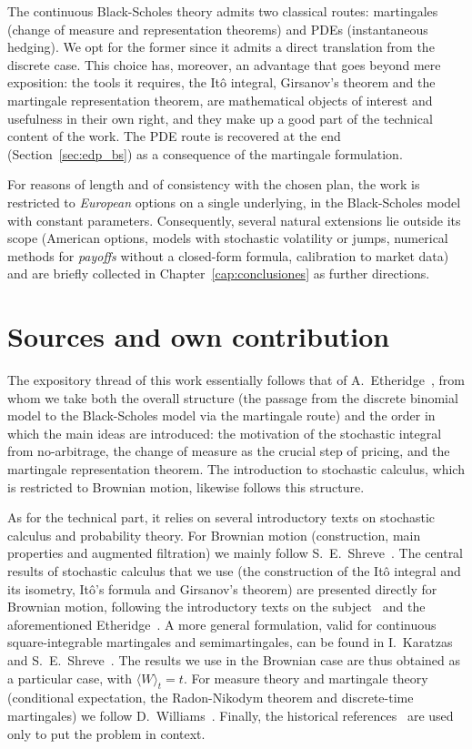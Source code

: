 \documentclass[11pt,a4paper,oneside]{report}
\theoremstyle{plain}
\theoremstyle{definition}
\theoremstyle{remark}
\newcommand{\1}{\mathbf{1}}
\begin{document}
The continuous Black-Scholes
theory admits two classical routes: martingales (change of measure
and representation theorems) and PDEs (instantaneous hedging). We opt
for the former since it admits a direct translation from the discrete
case. This choice has, moreover, an advantage that goes beyond mere
exposition: the tools it requires, the Itô integral, Girsanov's
theorem and the martingale representation theorem, are mathematical
objects of interest and usefulness in their own right, and they make
up a good part of the technical content of the work. The PDE route is
recovered at the end (Section~\ref{sec:edp_bs}) as a consequence of
the martingale formulation.

For reasons of
length and of consistency with the chosen plan, the work is
restricted to \emph{European} options on a single underlying, in the
Black-Scholes model with constant parameters. Consequently, several
natural extensions lie outside its scope (American options, models
with stochastic volatility or jumps, numerical methods for
\emph{payoffs} without a closed-form formula, calibration to market
data) and are briefly collected in Chapter~\ref{cap:conclusiones} as
further directions.

\section{Sources and own contribution}
\label{sec:aportacion}

The expository thread of this work essentially follows that of
A.~Etheridge~\cite{etheridge}, from whom we take both the overall
structure (the passage from the discrete binomial model to the
Black-Scholes model via the martingale route) and the order in which
the main ideas are introduced: the motivation of the stochastic
integral from no-arbitrage, the change of measure as the crucial step
of pricing, and the martingale representation theorem. The
introduction to stochastic calculus, which is restricted to Brownian
motion, likewise follows this structure.

As for the technical part, it relies on several introductory texts on
stochastic calculus and probability theory. For Brownian motion
(construction, main properties and augmented filtration) we mainly
follow S.~E.~Shreve~\cite{shreve}. The central results of stochastic
calculus that we use (the construction of the Itô integral and its
isometry, Itô's formula and Girsanov's theorem) are presented
directly for Brownian motion, following the introductory texts on
the subject~\cite{oksendal,shreve} and the aforementioned
Etheridge~\cite{etheridge}. A more general formulation, valid for
continuous square-integrable martingales and semimartingales, can be
found in I.~Karatzas and S.~E.~Shreve~\cite{karatzas-shreve}. The
results we use in the Brownian case are thus obtained as a particular
case, with $\langle W\rangle_t = t$. For measure theory and
martingale theory (conditional expectation, the Radon-Nikodym theorem
and discrete-time martingales) we follow D.~Williams~\cite{williams}.
Finally, the historical references~\cite{bachelier,black-scholes,merton}
are used only to put the problem in context.
\end{document}
